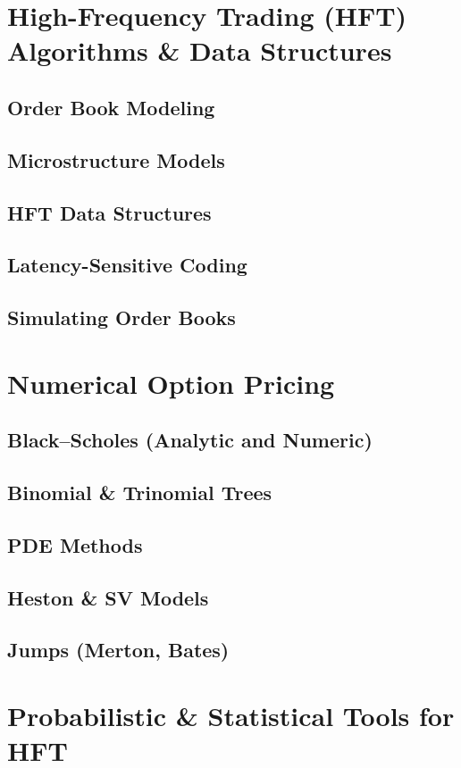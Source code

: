 \documentclass{report}
\begin{document}
\section{High-Frequency Trading (HFT) Algorithms \& Data Structures}

\subsection*{Order Book Modeling}
\subsection*{Microstructure Models}
\subsection*{HFT Data Structures}
\subsection*{Latency-Sensitive Coding}
\subsection*{Simulating Order Books}

\section{Numerical Option Pricing}

\subsection*{Black–Scholes (Analytic and Numeric)}
\subsection*{Binomial \& Trinomial Trees}
\subsection*{PDE Methods}
\subsection*{Heston \& SV Models}
\subsection*{Jumps (Merton, Bates)}

\section{Probabilistic \& Statistical Tools for HFT}
\end{document}
